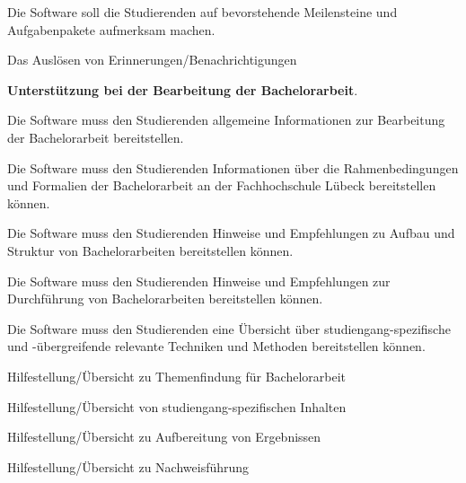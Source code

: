 \documentclass[bibliography=totoc,listof=totoc,BCOR=5mm,DIV=12,oneside]{scrbook}
\begin{document}
\begin{enumerate} [label=\textbf{PR\arabic*}]
\begin{enumerate} [label=\textit{[Req1.\arabic*]}]
\bigskip
\item \label{anf:erinnerungenBenachrichtigungen}Die Software soll die Studierenden auf bevorstehende Meilensteine und Aufgabenpakete aufmerksam machen.

\begin{enumerate} [label=\textit{[Req1.3.\arabic*]}]
\item \label{uanf:erinnerungAusloesen}Das Auslösen von Erinnerungen/Benachrichtigungen
\end{enumerate}
\end{enumerate}

\newpage
\item \label{prod:unterstuetzungBachelorarbeit} \textbf{Unterstützung bei der Bearbeitung der Bachelorarbeit}.

\begin{enumerate} [label=\textit{[Req2.\arabic*]}]
\item \label{anf:informationsTool} Die Software muss den Studierenden allgemeine Informationen zur Bearbeitung der Bachelorarbeit bereitstellen.

\begin{enumerate}[label=\textit{[Req2.1.\arabic*]}]
\item \label{anf:infRahmenbedingungenFormalien} Die Software muss den Studierenden Informationen über die Rahmenbedingungen und Formalien der Bachelorarbeit an der Fachhochschule Lübeck bereitstellen können.

\item \label{anf:infAufbauStruktur} Die Software muss den Studierenden Hinweise und Empfehlungen zu Aufbau und Struktur von Bachelorarbeiten bereitstellen können.

\item \label{anf:infDurchfuerungBachelorarbeit} Die Software muss den Studierenden Hinweise und Empfehlungen zur Durchführung von Bachelorarbeiten bereitstellen können.
\end{enumerate}

\bigskip
\item \label{anf:infMethodenTechniken} Die Software muss den Studierenden eine Übersicht über studiengang-spezifische und -übergreifende relevante Techniken und Methoden bereitstellen können.

\begin{enumerate} [label=\textit{[Req2.4.\arabic*]}]
\item \label{uanf:infThemenfindung} Hilfestellung/Übersicht zu Themenfindung für Bachelorarbeit
\item \label{uanf:infInhalt} Hilfestellung/Übersicht von studiengang-spezifischen Inhalten
\item \label{uanf:infAufbereitungErgebnisse} Hilfestellung/Übersicht zu Aufbereitung von Ergebnissen
\item \label{uanf:infNachweisfuerung} Hilfestellung/Übersicht zu Nachweisführung
\end{enumerate}


\end{enumerate}
\end{enumerate}
\end{document}
